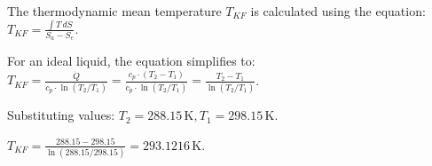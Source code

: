 The thermodynamic mean temperature \( T_{KF} \) is calculated using the equation:  
\( T_{KF} = \frac{\int T \, dS}{S_a - S_e} \).  

For an ideal liquid, the equation simplifies to:  
\( T_{KF} = \frac{\dot{Q}}{c_{p} \cdot \ln(T_2 / T_1)} = \frac{c_{p} \cdot (T_2 - T_1)}{c_{p} \cdot \ln(T_2 / T_1)} = \frac{T_2 - T_1}{\ln(T_2 / T_1)} \).  

Substituting values:  
\( T_2 = 288.15 \, \text{K}, T_1 = 298.15 \, \text{K} \).  

\( T_{KF} = \frac{288.15 - 298.15}{\ln(288.15 / 298.15)} = 293.1216 \, \text{K} \).